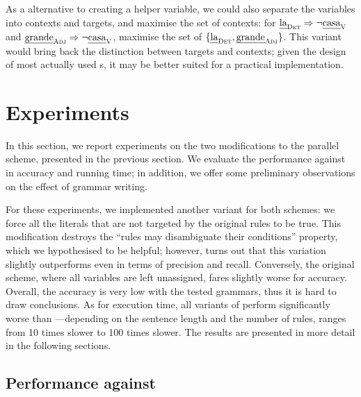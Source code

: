 As a alternative to creating a helper variable, we could also separate the variables into 
contexts and targets, and maximise the set of contexts: for $\text{\em la}_{\text{\sc Det}} \Rightarrow \neg \text{\em casa}_{\text{\sc V}}$
and $\text{\em grande}_{\text{\sc Adj}} \Rightarrow \neg \text{\em casa}_{\text{\sc V}}$, maximise the set of $\{\text{\em la}_{\text{\sc Det}}, \text{\em grande}_{\text{\sc Adj}}\}$.
This variant would bring back the distinction between targets and contexts; given the design of most actually used \onlycg{}s, it may be better suited for a practical implementation.


\section{Experiments}
\label{sec:eval}

In this section, we report experiments on the two modifications to the parallel scheme,
presented in the previous section. 
We evaluate the performance against  in accuracy and running time; in addition, we offer some preliminary observations on the effect of grammar writing.

For these experiments, we implemented another variant for both schemes: 
we force all the literals that are not targeted by the original rules to be true.
This modification destroys the ``rules may disambiguate their conditions'' property, 
which we hypothesised to be helpful; however, turns out that this variation 
slightly outperforms even  in terms of precision and recall.
Conversely, the original \satcg{} scheme, where all variables are left unassigned,
fares slightly worse for accuracy.
Overall, the accuracy is very low with the tested grammars, thus it is hard to draw conclusions.
As for execution time, all variants of \satcg{} perform significantly worse than ---depending on the sentence length and the number of rules, \satcg{} ranges from 10 times slower to 100 times slower.
The results are presented in more detail in the following sections.





\def\satcgMax{\satcg{}\textsubscript{Max}}
\def\satcgOrd{\satcg{}\textsubscript{Ord}}

\subsection{Performance against }



